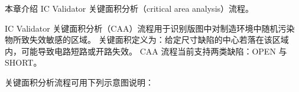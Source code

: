 \label{chap:caa}

本章介绍 IC Validator 关键面积分析（critical area analysis）流程。

IC Validator 关键面积分析（CAA）流程用于识别版图中对制造环境中随机污染物所致失效敏感的区域。
关键面积定义为：给定尺寸缺陷的中心若落在该区域内，可能导致电路短路或开路失效。
CAA 流程当前支持两类缺陷：OPEN 与 SHORT。


关键面积分析流程可用下列示意图说明：


